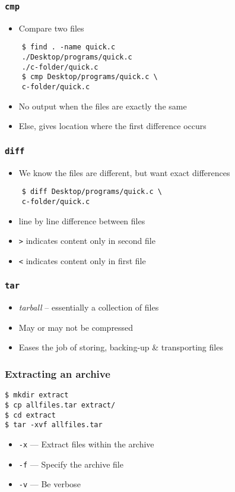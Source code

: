 \documentclass[12pt,compress]{beamer}
\begin{document}
\begin{frame}[fragile]
  \frametitle{\texttt{cmp}}
  \begin{itemize}
  \item Compare two files
  \end{itemize}
  \begin{lstlisting}
    $ find . -name quick.c
    ./Desktop/programs/quick.c
    ./c-folder/quick.c
    $ cmp Desktop/programs/quick.c \
    c-folder/quick.c
  \end{lstlisting} %
  \begin{itemize}
  \item No output when the files are exactly the same
  \item Else, gives location where the first difference occurs 
  \end{itemize}
\end{frame}

\begin{frame}[fragile]
  \frametitle{\texttt{diff}}
  \begin{itemize}
  \item We know the files are different, but want exact differences
  \end{itemize}
  \begin{lstlisting}
    $ diff Desktop/programs/quick.c \
    c-folder/quick.c
  \end{lstlisting} %
  \begin{itemize}
  \item line by line difference between files
  \item \texttt{>} indicates content only in second file
  \item \texttt{<} indicates content only in first file
  \end{itemize}
\end{frame}

\begin{frame}[fragile]
\frametitle{\texttt{tar}}
\begin{itemize}
\item \emph{tarball} -- essentially a collection of files
\item May or may not be compressed
\item Eases the job of storing, backing-up \& transporting files
\end{itemize}
\end{frame}

\begin{frame}[fragile]
\frametitle{Extracting an archive}

\begin{lstlisting}
$ mkdir extract 
$ cp allfiles.tar extract/ 
$ cd extract 
$ tar -xvf allfiles.tar
\end{lstlisting} %

\begin{itemize}
\item \texttt{-x} --- Extract files within the archive
\item \texttt{-f} --- Specify the archive file
\item \texttt{-v} --- Be verbose
\end{itemize}
\end{frame}
\end{document}
